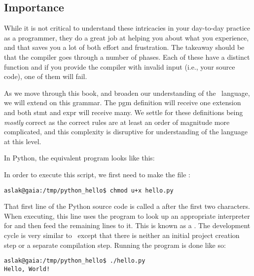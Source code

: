
\subsection{Importance}

While it is not critical to understand these intricacies in your day-to-day practice as a programmer, they do a great job at helping you  about what you experience, and that saves you a lot of both effort and frustration. The takeaway should be that the compiler goes through a number of phases. Each of these have a distinct function and if you provide the compiler with invalid input (i.e., your source code), one of them will fail.

As we move through this book, and broaden our understanding of the \csharp\ language, we will extend on this grammar. The pgm definition will receive one extension and both stmt and expr will receive many. We settle for these definitions being \textsl{mostly} correct as the correct rules are at least an order of magnitude more complicated, and this complexity is disruptive for understanding of the language at this level.

\label{sec:first:python}

In Python, the equivalent program looks like this:


In order to execute this script, we first need to make the file :
\begin{verbatim}
aslak@gaia:/tmp/python_hello$ chmod u+x hello.py
\end{verbatim}

That first line of the Python source code is called a  after the first two characters. When executing, this line uses the  program to look up an appropriate interpreter for  and then feed the remaining lines to it. This is known as a . The development cycle is very similar to \csharp\ except that there is neither an initial project creation step or a separate compilation step. Running the program is done like so:

\begin{verbatim}
aslak@gaia:/tmp/python_hello$ ./hello.py
Hello, World!
\end{verbatim}

